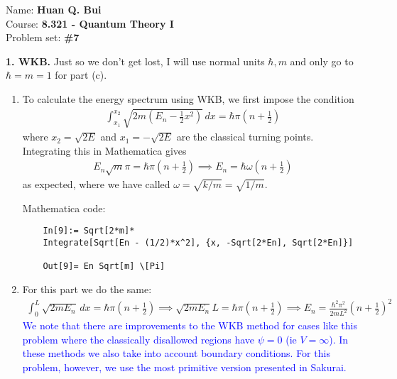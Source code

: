 \documentclass{article}
\theoremstyle{definition}
\newcommand{\f}[2]{\frac{#1}{#2}}
\newcommand{\lp}{\left(}
\newcommand{\rp}{\right)}
\begin{document}
\begin{framed}
\noindent Name: \textbf{Huan Q. Bui}\\
Course: \textbf{8.321 - Quantum Theory I}\\
Problem set: \textbf{\#7}
\end{framed}
	

	
	
	
\noindent \textbf{1. WKB.} Just so we don't get lost, I will use normal units $\hbar,m$ and only go to $\hbar = m = 1$ for part (c).

\begin{enumerate}[label=(\alph*)]
	\item To calculate the energy spectrum using WKB, we first impose the condition
	\begin{align*}
	\int^{x_2}_{x_1} \sqrt{2m \lp E_n - \f{1}{2}x^2 \rp}\,dx =  \hbar \pi \lp n + \f{1}{2}\rp 
	\end{align*}
	where $x_2 = \sqrt{2E}$ and $x_1 = -\sqrt{2E}$ are the classical turning points. Integrating this in Mathematica gives
	\begin{align*}
	E_n \sqrt{m} \pi = \hbar \pi \lp n + \f{1}{2}\rp \implies \boxed{ E_n = \hbar \omega \lp n + \f{1}{2} \rp}
	\end{align*}
	as expected, where we have called $\omega = \sqrt{k/m} = \sqrt{1/m}$. 
	
	
	Mathematica code:
	\begin{lstlisting}
	In[9]:= Sqrt[2*m]*
	Integrate[Sqrt[En - (1/2)*x^2], {x, -Sqrt[2*En], Sqrt[2*En]}]
	
	Out[9]= En Sqrt[m] \[Pi]
	\end{lstlisting}
	
	\item For this part we do the same:
	\begin{align*}
	\int_0^L \sqrt{2mE_n}\,dx = \hbar \pi \lp n + \f{1}{2} \rp \implies \sqrt{2m E_n} L =  \hbar \pi \lp n + \f{1}{2} \rp \implies \boxed{E_n = \f{\hbar^2 \pi^2}{2m L^2}\lp n + \f{1}{2} \rp^2}
	\end{align*}
	\textcolor{blue}{We note that there are improvements to the WKB method for cases like this problem where the classically disallowed regions have $\psi = 0$ (ie $V = \infty$). In these methods we also take into account boundary conditions. For this problem, however, we use the most primitive version presented in Sakurai.}
	

\end{enumerate}
\end{document}
